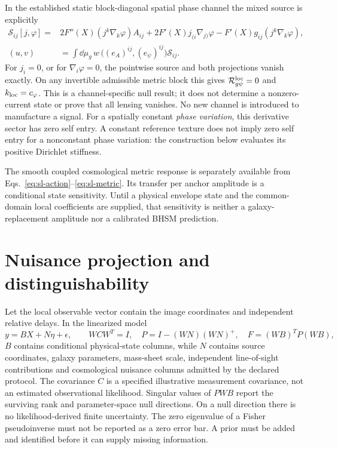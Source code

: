 In the established static block-diagonal spatial phase channel the mixed
source is explicitly
\begin{align}
 \mathcal S_{ij}[j,\varphi]={}&
 2F''(X)(j^k\nabla_k\varphi)A_{ij}
 +2F'(X)j_{(i}\nabla_{j)}\varphi
 -F'(X)g_{ij}(j^k\nabla_k\varphi),\nonumber\\
 (u,v)&=\int\dd\mu_g\,w\,
 \big((e_A)^{ij},(e_\psi)^{ij}\big)\mathcal S_{ij}.
 \label{eq:sl-static-current}
\end{align}
For $j_i=0$, or for $\nabla_i\varphi=0$, the pointwise source and both
projections vanish exactly. On any invertible admissible metric block this
gives $\mathcal R_{g\psi}^{\rm loc}=0$ and
$k_{\rm loc}=c_\varphi$. This is a channel-specific null result; it does
not determine a nonzero-current state or prove that all lensing vanishes.
No new channel is introduced to manufacture a signal.
For a spatially constant \emph{phase variation}, this derivative sector
has zero self entry. A constant reference texture does not imply zero
self entry for a nonconstant phase variation: the construction below
evaluates its positive Dirichlet stiffness.

The smooth coupled cosmological metric response is separately available
from Eqs.~\eqref{eq:sl-action}--\eqref{eq:sl-metric}. Its transfer per anchor
amplitude is a conditional state sensitivity. Until a physical envelope
state and the common-domain local coefficients are supplied, that
sensitivity is neither a galaxy-replacement amplitude nor a calibrated
BHSM prediction.

\section{Nuisance projection and distinguishability}
\label{sec:sl-identifiability}
Let the local observable vector contain the image coordinates and independent
relative delays. In the linearized model
\begin{equation}
 y=BX+N\eta+\epsilon,\qquad
 WCW^T=I,\quad P=I-(WN)(WN)^+,
 \quad F=(WB)^TP(WB),
 \label{eq:sl-fisher}
\end{equation}
$B$ contains conditional physical-state columns, while $N$ contains source
coordinates, galaxy parameters, mass-sheet scale, independent line-of-sight
contributions and cosmological nuisance columns admitted by the declared
protocol. The covariance $C$ is a specified illustrative measurement
covariance, not an estimated observational likelihood. Singular values of
$PWB$ report the surviving rank and parameter-space null directions.
On a null direction there is no likelihood-derived finite uncertainty.
The zero eigenvalue of a Fisher pseudoinverse must not be reported as a
zero error bar. A prior must be added and identified before it can supply
missing information.

